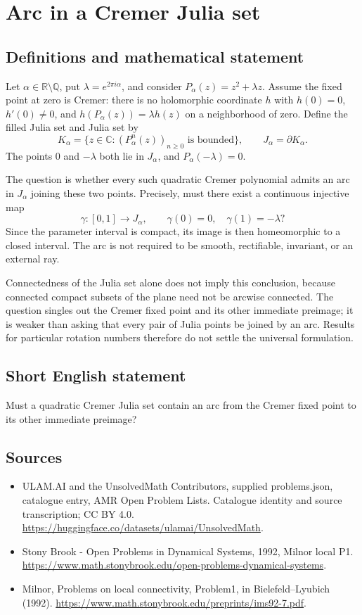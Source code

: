 \documentclass[11pt,a4paper]{article}
\begin{document}
\section*{Arc in a Cremer Julia set}\label{statement}

\subsection{Definitions and mathematical statement}
Let $\alpha\in\mathbb R\setminus\mathbb Q$, put
$\lambda=e^{2\pi i\alpha}$, and consider $P_\alpha(z)=z^2+\lambda z$.
Assume the fixed point at zero is Cremer: there is no holomorphic
coordinate $h$ with $h(0)=0$, $h'(0)\ne0$, and
$h(P_\alpha(z))=\lambda h(z)$ on a neighborhood of zero.
Define the filled Julia set and Julia set by
\[
 K_\alpha=\{z\in\mathbb C:(P_\alpha^n(z))_{n\ge0}
                     \text{ is bounded}\},\qquad
 J_\alpha=\partial K_\alpha.
\]
The points $0$ and $-\lambda$ both lie in $J_\alpha$, and
$P_\alpha(-\lambda)=0$.

The question is whether every such quadratic Cremer polynomial admits
an arc in $J_\alpha$ joining these two points. Precisely, must there
exist a continuous injective map
\[
 \gamma:[0,1]\to J_\alpha,\qquad
 \gamma(0)=0,\quad\gamma(1)=-\lambda?
\]
Since the parameter interval is compact, its image is then homeomorphic
to a closed interval. The arc is not required to be smooth, rectifiable,
invariant, or an external ray.

Connectedness of the Julia set alone does not imply this conclusion,
because connected compact subsets of the plane need not be arcwise
connected. The question singles out the Cremer fixed point and its
other immediate preimage; it is weaker than asking that every pair of
Julia points be joined by an arc. Results for particular rotation
numbers therefore do not settle the universal formulation.
\subsection{Short English statement}
Must a quadratic Cremer Julia set contain an arc from the Cremer fixed point to its other immediate preimage?
\subsection{Sources}
\begin{itemize}
\item[S1] ULAM.AI and the UnsolvedMath Contributors, supplied problems.json, catalogue entry, AMR Open Problem Lists. Catalogue identity and source transcription; CC BY 4.0.
\url{https://huggingface.co/datasets/ulamai/UnsolvedMath}.
\item[S2] Stony Brook - Open Problems in Dynamical Systems, 1992, Milnor local P1. 
\url{https://www.math.stonybrook.edu/open-problems-dynamical-systems}.
\item[S3] Milnor, Problems on local connectivity, Problem1, in Bielefeld–Lyubich (1992).
\url{https://www.math.stonybrook.edu/preprints/ims92-7.pdf}.
\end{itemize}
\end{document}
